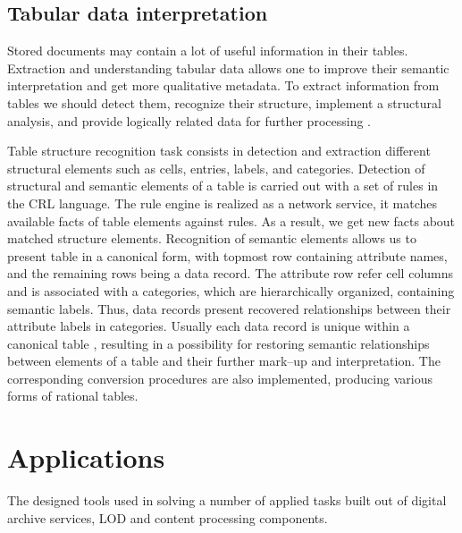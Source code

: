 \documentclass[conference,a4paper]{IEEEtran}
\begin{document}
\subsection{Tabular data interpretation}

Stored documents may contain a lot of useful information in their tables.  Extraction and understanding tabular data allows one to improve their semantic interpretation and get more qualitative metadata.  To extract information from tables we should detect them, recognize their structure, implement a structural analysis, and provide logically related data for further processing \cite{Shigarov_2017}.

Table structure recognition task consists in detection and extraction different structural elements such as cells, entries, labels, and categories.  Detection of structural and semantic elements of a table is carried out with a set of rules in the CRL language.  The rule engine is realized as a network service, it matches available facts of table elements against rules.  As a result, we get new facts about matched structure elements.  Recognition of semantic elements allows us to present table in a canonical form, with topmost row containing attribute names, and the remaining rows being a data record.  The attribute row refer cell columns and is associated with a categories, which are hierarchically organized, containing semantic labels.  Thus, data records present recovered relationships between their attribute labels in  categories.  Usually each data record is unique within a canonical table \cite{Shigarov_2016}, resulting in a possibility for restoring semantic relationships between elements of a table and their further mark--up and interpretation.  The corresponding conversion procedures are also implemented, producing various forms of rational tables.

\section{Applications}

The designed tools used in solving a number of applied tasks built out of digital archive services, LOD and content processing components.
\end{document}
